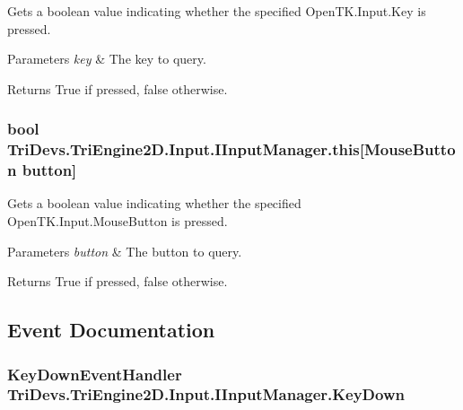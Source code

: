 Gets a boolean value indicating whether the specified Open\-T\-K.\-Input.\-Key is pressed. 


\begin{DoxyParams}{Parameters}
{\em key} & The key to query.\\
\hline
\end{DoxyParams}
\begin{DoxyReturn}{Returns}
True if pressed, false otherwise.
\end{DoxyReturn}
\hypertarget{interface_tri_devs_1_1_tri_engine2_d_1_1_input_1_1_i_input_manager_a1ab67e0dc3518f968641893310d47db1}{
\subsubsection[{this[Mouse\-Button button]}]{\setlength{\rightskip}{0pt plus 5cm}bool Tri\-Devs.\-Tri\-Engine2\-D.\-Input.\-I\-Input\-Manager.\-this\mbox{[}Mouse\-Button button\mbox{]}\hspace{0.3cm}{\ttfamily [get]}}}\label{interface_tri_devs_1_1_tri_engine2_d_1_1_input_1_1_i_input_manager_a1ab67e0dc3518f968641893310d47db1}


Gets a boolean value indicating whether the specified Open\-T\-K.\-Input.\-Mouse\-Button is pressed. 


\begin{DoxyParams}{Parameters}
{\em button} & The button to query.\\
\hline
\end{DoxyParams}
\begin{DoxyReturn}{Returns}
True if pressed, false otherwise.
\end{DoxyReturn}


\subsection{Event Documentation}
\hypertarget{interface_tri_devs_1_1_tri_engine2_d_1_1_input_1_1_i_input_manager_a5948602f547dc681864f39def0808154}{
\subsubsection[{Key\-Down}]{\setlength{\rightskip}{0pt plus 5cm}Key\-Down\-Event\-Handler Tri\-Devs.\-Tri\-Engine2\-D.\-Input.\-I\-Input\-Manager.\-Key\-Down}}\label{interface_tri_devs_1_1_tri_engine2_d_1_1_input_1_1_i_input_manager_a5948602f547dc681864f39def0808154}


